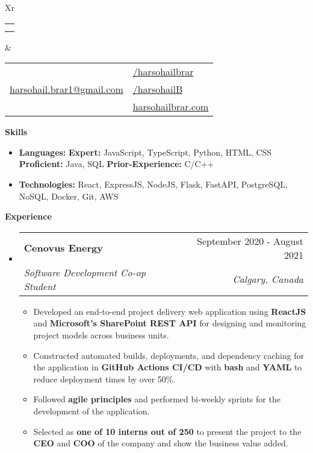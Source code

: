 \documentclass[letterpaper,12pt]{article}[leftmargin=*]
\makeatletter
\def \fullname {Harsohail Brar}
\def \subtitle {}
\def \linkedinicon {\faLinkedin}
\def \linkedinlink {https://www.linkedin.com/in/harsohailbrar/}
\def \linkedintext {/harsohailbrar}
\def \phoneicon {\faPhone}
\def \phonetext {+1-204-218-7511}
\def \emailicon {\faEnvelope}
\def \emaillink {mailto:harsohail.brar1@gmail.com}
\def \emailtext {harsohail.brar1@gmail.com}
\def \githubicon {\faGithub}
\def \githublink {https://github.com/harsohailB}
\def \githubtext {/harsohailB}
\def \websiteicon {\faGlobe}
\def \websitelink {https://www.harsohailbrar.com}
\def \websitetext {harsohailbrar.com}
\def \headertype {\doublecol} %
\def \entryspacing {-0pt}
\def \linkedin {\linkedinicon \hspace{3pt}\href{\linkedinlink}{\linkedintext}}
\def \phone {\phoneicon \hspace{3pt}{ \phonetext}}
\def \email {\emailicon \hspace{3pt}\href{\emaillink}{\emailtext}}
\def \github {\githubicon \hspace{3pt}\href{\githublink}{\githubtext}}
\def \website {\websiteicon \hspace{3pt}\href{\websitelink}{\websitetext}}
\renewcommand{\section}[2]{\vspace{5pt}
  \colorbox{secondary}{\color{white}\raggedbottom\normalsize\textbf{{#1}{\hspace{7pt}#2}}}
}
\newcommand{\resumeEntryStart}{\begin{itemize}[leftmargin=2.5mm]}
\newcommand{\resumeEntryEnd}{\end{itemize}\vspace{\entryspacing}}
\newcommand{\resumeItemListStart}{\begin{itemize}[leftmargin=4.5mm]}
\newcommand{\resumeItemListEnd}{\end{itemize}}
\newcommand{\resumeItem}[1]{
  \item\footnotesize{
    {#1 \vspace{-2pt}}
  }
}
\newcommand{\resumeEntryTSDL}[4]{
  \vspace{-1pt}\item[]
    \begin{tabularx}{0.97\textwidth}{X@{\hspace{60pt}}r}
      \textbf{\color{primary}#1} & {\firabook\color{accent}\small#2} \\
      \textit{\color{accent}\small#3} & \textit{\color{accent}\small#4} \\
    \end{tabularx}\vspace{-6pt}
}
\newcommand{\resumeEntryS}[2]{
  \item[]\footnotesize{
    \textbf{\color{primary}#1 }{ #2 \vspace{-6pt}}
  }
}
\newcommand{\doublecol}[6]{
  \begin{tabularx}{\textwidth}{Xr}
    {
      \begin{tabular}[c]{l}
        \fontsize{35}{45}\selectfont{\color{primary}{{\textbf{\fullname}}}} \\
        {\textit{\subtitle}} %
      \end{tabular}
    } & {
      \begin{tabular}[c]{l@{\hspace{1.5em}}l}
        {\small#4} & {\small#1} \\
        {\small#5} & {\small#2} \\
        {\small#6} & {\small#3}
      \end{tabular}
    }
  \end{tabularx}
}
\newcommand{\singlecol}[6]{
  \begin{tabularx}{\textwidth}{Xr}
    {
      \begin{tabular}[b]{l}
        \fontsize{35}{45}\selectfont{\color{primary}{{\textbf{\fullname}}}} \\
        {\textit{\subtitle}} %
      \end{tabular}
    } & {
      \begin{tabular}[c]{l}
        {\small#1} \\
        {\small#2} \\
        {\small#3} \\
        {\small#4} \\
        {\small#5} \\
        {\small#6}
      \end{tabular}
    }
  \end{tabularx}
}
\makeatother
\begin{document}


\headertype{\linkedin}{\github}{\website}{\phone}{\email}{} %
\vspace{-10pt} %

\section{\faGears}{Skills}
\vspace{5pt}
 \resumeEntryStart
  \resumeEntryS{Languages: \hspace{13pt}} {{\bf Expert:} JavaScript, TypeScript, Python, HTML, CSS {\bf Proficient:} Java, SQL {\bf Prior-Experience:} C/C++}
  \resumeEntryS{Technologies: } {React, ExpressJS, NodeJS, Flask, FastAPI, PostgreSQL, NoSQL, Docker, Git, AWS}
  \vspace{5pt}
 \resumeEntryEnd
 
\section{\faPieChart}{Experience}

  \resumeEntryStart
    \resumeEntryTSDL
      {Cenovus Energy}{September 2020 - August 2021}
      {Software Development Co-op Student}{Calgary, Canada}
    \resumeItemListStart
      \resumeItem {Developed an end-to-end project delivery web application using {\bf ReactJS} and {\bf Microsoft’s SharePoint REST API} for
designing and monitoring project models across business units.}
      \resumeItem {Constructed automated builds, deployments, and dependency caching for the application in {\bf GitHub Actions CI/CD}
   \hspace{10pt} with {\bf bash} and {\bf YAML} to reduce deployment times by over 50\%.}
      \resumeItem {Followed {\bf agile principles} and performed bi-weekly sprints for the development of the application.} 
      \resumeItem {Selected as {\bf one of 10 interns out of 250} to present the project to the {\bf CEO} and {\bf COO} of the company and show
    the business value added.}
    \resumeItemListEnd
  \resumeEntryEnd
\end{document}
